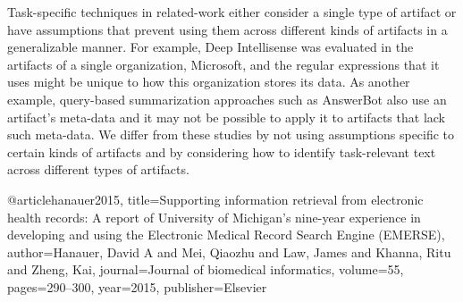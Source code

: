 Task-specific techniques in related-work either consider a single type of artifact
or have assumptions that prevent using them across different kinds of artifacts 
in a generalizable manner. For example, 
Deep Intellisense was evaluated in the artifacts of a single organization, 
Microsoft, and the regular expressions that it uses might be unique to 
how this organization stores its data. As another example, 
query-based summarization approaches such as AnswerBot also use 
an artifact's meta-data and it may not be possible to apply it 
to artifacts that lack such meta-data. 
We differ from these studies 
by not using assumptions 
specific to certain kinds of artifacts
and by considering how to identify task-relevant text 
across different types of artifacts.



@article{hanauer2015,
  title={Supporting information retrieval from electronic health records: A report of University of Michigan’s nine-year experience in developing and using the Electronic Medical Record Search Engine (EMERSE)},
  author={Hanauer, David A and Mei, Qiaozhu and Law, James and Khanna, Ritu and Zheng, Kai},
  journal={Journal of biomedical informatics},
  volume={55},
  pages={290--300},
  year={2015},
  publisher={Elsevier}
}
